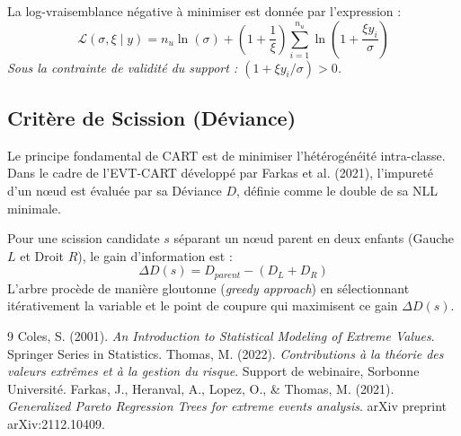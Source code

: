 \documentclass[11pt,a4paper]{article}
\begin{document}
\begin{tcolorbox}[colback=white, colframe=bordergray, title=Negative Log-Likelihood (NLL)]
La log-vraisemblance négative à minimiser est donnée par l'expression :
\begin{equation}
    \mathcal{L}(\sigma, \xi \mid y) = n_u \ln(\sigma) + \left(1 + \frac{1}{\xi}\right) \sum_{i=1}^{n_u} \ln\left(1 + \frac{\xi y_i}{\sigma}\right)
\end{equation}
\textit{Sous la contrainte de validité du support : $(1 + \xi y_i / \sigma) > 0$.}
\end{tcolorbox}

\subsection{Critère de Scission (Déviance)}
Le principe fondamental de CART est de minimiser l'hétérogénéité intra-classe. Dans le cadre de l'EVT-CART développé par Farkas et al. (2021), l'impureté d'un nœud est évaluée par sa Déviance $D$, définie comme le double de sa NLL minimale.

Pour une scission candidate $s$ séparant un nœud parent en deux enfants (Gauche $L$ et Droit $R$), le gain d'information est :
\begin{equation}
    \Delta D(s) = D_{parent} - (D_L + D_R)
\end{equation}
L'arbre procède de manière gloutonne (\textit{greedy approach}) en sélectionnant itérativement la variable et le point de coupure qui maximisent ce gain $\Delta D(s)$.

\newpage


\newpage

\begin{thebibliography}{9}
Coles, S. (2001). 
\textit{An Introduction to Statistical Modeling of Extreme Values}. Springer Series in Statistics.
Thomas, M. (2022).
\textit{Contributions à la théorie des valeurs extrêmes et à la gestion du risque}. Support de webinaire, Sorbonne Université.
Farkas, J., Heranval, A., Lopez, O., \& Thomas, M. (2021). 
\textit{Generalized Pareto Regression Trees for extreme events analysis}. arXiv preprint arXiv:2112.10409.
\end{thebibliography}
\end{document}
